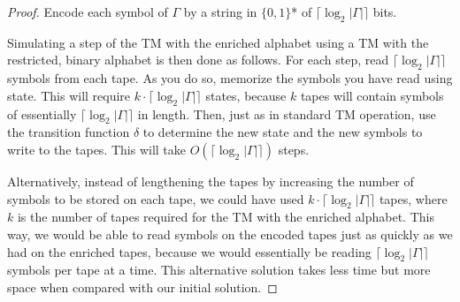 \documentclass[usletter]{article}
\begin{document}
\begin{proof}
Encode each symbol of $\Gamma$ by a string in $\{0,1\}$* of $\lceil\log_2|\Gamma|\rceil$ bits.

Simulating a step of the TM with the enriched alphabet using a TM with the restricted, binary alphabet is then done as follows. For each step, read $\lceil\log_2|\Gamma|\rceil$ symbols from each tape. As you do so, memorize the symbols you have read using state. This will require $k\cdot\lceil\log_2|\Gamma|\rceil$ states, because $k$ tapes will contain symbols of essentially $\lceil\log_2|\Gamma|\rceil$ in length. Then, just as in standard TM operation, use the transition function $\delta$ to determine the new state and the new symbols to write to the tapes. This will take $O(\lceil\log_2|\Gamma|\rceil)$ steps.

Alternatively, instead of lengthening the tapes by increasing the number of symbols to be stored on each tape, we could have used $k\cdot\lceil\log_2|\Gamma|\rceil$ tapes, where $k$ is the number of tapes required for the TM with the enriched alphabet. This way, we would be able to read symbols on the encoded tapes just as quickly as we had on the enriched tapes, because we would essentially be reading $\lceil\log_2|\Gamma|\rceil$ symbols per tape at a time. This alternative solution takes less time but more space when compared with our initial solution.

\end{proof}
\end{document}
